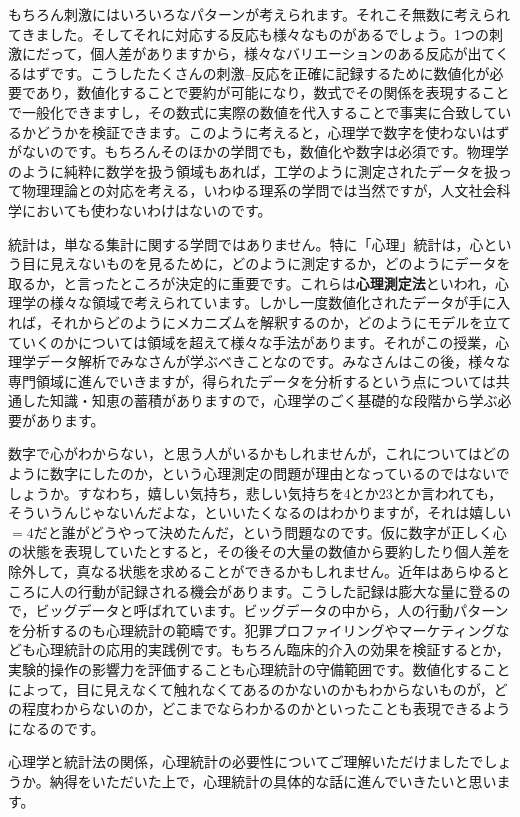 \documentclass{ltjsbook}
\begin{document}
もちろん刺激にはいろいろなパターンが考えられます。それこそ無数に考えられてきました。そしてそれに対応する反応も様々なものがあるでしょう。1つの刺激にだって，個人差がありますから，様々なバリエーションのある反応が出てくるはずです。こうしたたくさんの刺激--反応を正確に記録するために数値化が必要であり，数値化することで要約が可能になり，数式でその関係を表現することで一般化できますし，その数式に実際の数値を代入することで事実に合致しているかどうかを検証できます。このように考えると，心理学で数字を使わないはずがないのです。もちろんそのほかの学問でも，数値化や数字は必須です。物理学のように純粋に数学を扱う領域もあれば，工学のように測定されたデータを扱って物理理論との対応を考える，いわゆる理系の学問では当然ですが，人文社会科学においても使わないわけはないのです。

統計は，単なる集計に関する学問ではありません。特に「心理」統計は，心という目に見えないものを見るために，どのように測定するか，どのようにデータを取るか，と言ったところが決定的に重要です。これらは\textbf{心理測定法}といわれ，心理学の様々な領域で考えられています。しかし一度数値化されたデータが手に入れば，それからどのようにメカニズムを解釈するのか，どのようにモデルを立てていくのかについては領域を超えて様々な手法があります。それがこの授業，心理学データ解析でみなさんが学ぶべきことなのです。みなさんはこの後，様々な専門領域に進んでいきますが，得られたデータを分析するという点については共通した知識・知恵の蓄積がありますので，心理学のごく基礎的な段階から学ぶ必要があります。

数字で心がわからない，と思う人がいるかもしれませんが，これについてはどのように数字にしたのか，という心理測定の問題が理由となっているのではないでしょうか。すなわち，嬉しい気持ち，悲しい気持ちを4とか23とか言われても，そういうんじゃないんだよな，といいたくなるのはわかりますが，それは嬉しい$=4$だと誰がどうやって決めたんだ，という問題なのです。仮に数字が正しく心の状態を表現していたとすると，その後その大量の数値から要約したり個人差を除外して，真なる状態を求めることができるかもしれません。近年はあらゆるところに人の行動が記録される機会があります。こうした記録は膨大な量に登るので，ビッグデータと呼ばれています。ビッグデータの中から，人の行動パターンを分析するのも心理統計の範疇です。犯罪プロファイリングやマーケティングなども心理統計の応用的実践例です。もちろん臨床的介入の効果を検証するとか，実験的操作の影響力を評価することも心理統計の守備範囲です。数値化することによって，目に見えなくて触れなくてあるのかないのかもわからないものが，どの程度わからないのか，どこまでならわかるのかといったことも表現できるようになるのです。

心理学と統計法の関係，心理統計の必要性についてご理解いただけましたでしょうか。納得をいただいた上で，心理統計の具体的な話に進んでいきたいと思います。
\end{document}
